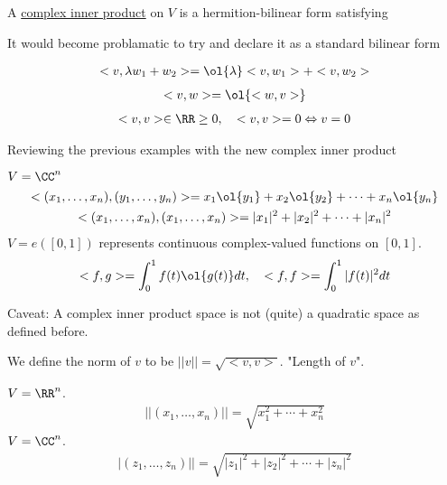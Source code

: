 \documentclass[class=scrartcl, crop=false]{standalone}
\begin{document}
\begin{definition}
  A \ul{complex inner product} on $V$ is a hermition-bilinear form satisfying
  \begin{note}
    It would become problamatic to try and declare it as a standard bilinear form
  \end{note} 
  \begin{enumerate}
    \ii
    \begin{gather*}
      <v, \lambda w_1 + w_2> = \ol{\lambda}<v, w_1> + <v, w_2>
    \end{gather*} 
    \ii
    \begin{gather*}
      <v, w> = \ol{<w, v>}
    \end{gather*} 
    \ii
    \begin{gather*}
      <v, v> \in \RR \geq 0, \quad <v, v> = 0 \Leftrightarrow v = 0
    \end{gather*} 
  \end{enumerate} 
  
\end{definition} 

\begin{example}
  Reviewing the previous examples with the new complex inner product
  \begin{enumerate}
    \ii
    $V = \CC^n$
    \begin{gather*}
      <(x_1, \dots, x_n), (y_1, \dots, y_n)> = x_1\ol{y_1} + x_2\ol{y_2} + \cdots + x_n\ol{y_n} \\
      <(x_1, \dots, x_n), (x_1, \dots, x_n)> = |x_1|^2 + |x_2|^2 + \cdots + |x_n|^2 \\
    \end{gather*} 
    \ii
    $V = e([0, 1])$ represents continuous complex-valued functions on $[0, 1]$.
    \begin{gather*}
      <f, g> = \int_0^1f(t)\ol{g(t)}dt, \quad <f, f> = \int_0^1|f(t)|^2dt
    \end{gather*} 
  \end{enumerate} 
\end{example} 

\begin{note}
  Caveat: A complex inner product space is not (quite) a quadratic space as defined before.

  We define the norm of $v$ to be $||v|| = \sqrt{<v, v>}$. "Length of $v$".
\end{note} 

\begin{example}
  \begin{enumerate}
    \ii
    $V = \RR^n$.
    \begin{gather*}
      ||(x_1, \dots, x_n)|| = \sqrt{x_1^2 + \cdots + x_n^2}
    \end{gather*} 
    \ii
    $V = \CC^n$.
    \begin{gather*}
      |(z_1, \dots, z_n)|| = \sqrt{|z_1|^2 + |z_2|^2 + \cdots + |z_n|^2}
    \end{gather*} 
  \end{enumerate} 
\end{example} 
\end{document}
